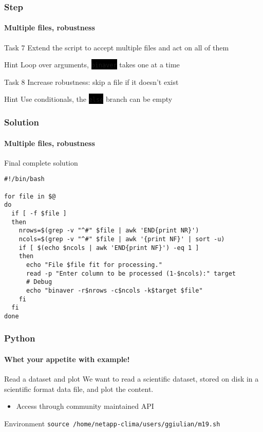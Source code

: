 \documentclass[unknownkeysallowed, 10pt, a4 paper, handout]{beamer}
\newcommand{\code}[1]{\colorbox{black}{\color{green}\texttt{#1}}}
\begin{document}
\begin{frame}
  \frametitle{Step}
  \framesubtitle{Multiple files, robustness}

  \begin{exampleblock}{Task 7}
    Extend the script to accept multiple files and act on all of them
  \end{exampleblock}

  \begin{alertblock}{Hint}
    Loop over arguments, \code{binaver} takes one at a time
  \end{alertblock}

  \begin{exampleblock}{Task 8}
    Increase robustness: skip a file if it doesn't exist
  \end{exampleblock}

  \begin{alertblock}{Hint}
    Use conditionals, the \code{else} branch can be empty
  \end{alertblock}
\end{frame}


\begin{frame}[fragile=singleslide]
  \frametitle{Solution}
  \framesubtitle{Multiple files, robustness}

  \begin{exampleblock}{Final complete solution}
    \small{
    \begin{verbatim}
#!/bin/bash

for file in $@
do
  if [ -f $file ]
  then
    nrows=$(grep -v "^#" $file | awk 'END{print NR}')
    ncols=$(grep -v "^#" $file | awk '{print NF}' | sort -u)
    if [ $(echo $ncols | awk 'END{print NF}') -eq 1 ]
    then
      echo "File $file fit for processing."
      read -p "Enter column to be processed (1-$ncols):" target
      # Debug
      echo "binaver -r$nrows -c$ncols -k$target $file"
    fi
  fi
done
    \end{verbatim}
    }
  \end{exampleblock}
\end{frame}


\begin{frame}[fragile=singleslide]
  \frametitle{Python}
  \framesubtitle{Whet your appetite with example!}

  \begin{exampleblock}{Read a dataset and plot}
    We want to read a scientific dataset, stored on disk
    in a scientific format data file, and plot the content.
    \begin{itemize}
       \item Access through community maintained API
    \end{itemize}
  \end{exampleblock}

  \begin{alertblock}{Environment}
    \verb|source /home/netapp-clima/users/ggiulian/m19.sh|
  \end{alertblock}
\end{frame}
\end{document}
